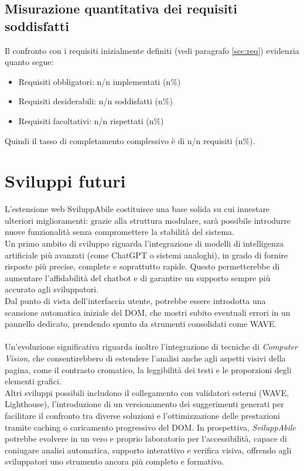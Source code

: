 \subsection{Misurazione quantitativa dei requisiti soddisfatti}
Il confronto con i requisiti inizialmente definiti (vedi paragrafo \ref{sec:req}) evidenzia quanto segue:
\begin{itemize}
    \item Requisiti obbligatori: n/n implementati (n\%)
    \item Requisiti desiderabili: n/n soddisfatti (n\%)
    \item Requisiti facoltativi: n/n rispettati (n\%)
\end{itemize}
Quindi il tasso di completamento complessivo è di n/n requisiti (n\%).

\section{Sviluppi futuri}
\noindent L’estensione web SviluppAbile costituisce una base solida su cui innestare ulteriori miglioramenti: grazie alla struttura modulare, sarà possibile introdurre nuove funzionalità senza compromettere la stabilità del sistema.\\
Un primo ambito di sviluppo riguarda l’integrazione di modelli di intelligenza artificiale più avanzati (come ChatGPT o sistemi analoghi), in grado di fornire risposte più precise, complete e soprattutto rapide. Questo permetterebbe di aumentare l’affidabilità del chatbot e di garantire un supporto sempre più accurato agli sviluppatori.\\
Dal punto di vista dell’interfaccia utente, potrebbe essere introdotta una scansione automatica iniziale del DOM, che mostri subito eventuali errori in un pannello dedicato, prendendo spunto da strumenti consolidati come WAVE.\\
\\
Un’evoluzione significativa riguarda inoltre l’integrazione di tecniche di \textit{Computer Vision}, che consentirebbero di estendere l’analisi anche agli aspetti visivi della pagina, come il contrasto cromatico, la leggibilità dei testi e le proporzioni degli elementi grafici.\\
Altri sviluppi possibili includono il collegamento con validatori esterni (WAVE, Lighthouse), l’introduzione di un versionamento dei suggerimenti generati per facilitare il confronto tra diverse soluzioni e l’ottimizzazione delle prestazioni tramite caching o caricamento progressivo del DOM.
In prospettiva, \textit{SviluppAbile} potrebbe evolvere in un vero e proprio laboratorio per l’accessibilità, capace di coniugare analisi automatica, supporto interattivo e verifica visiva, offrendo agli sviluppatori uno strumento ancora più completo e formativo.

